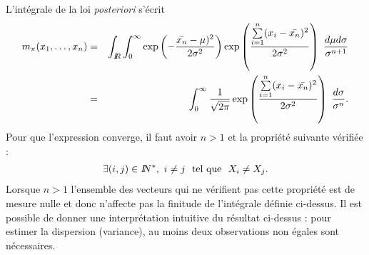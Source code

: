\begin{rep} %
L'intégrale de la loi {\it posteriori} s'écrit
\begin{eqnarray*}
m_{\pi}(x_1,\ldots,x_n) & = & \int_{\R} \int_{0}^{\infty} \exp\left(-\frac{\bar{x_n}-\mu)^2}{2\sigma^2}\right) \exp\left( \frac{\sum\limits_{i=1}^n (x_i-\bar{x_n})^2}{2\sigma^2}\right) \ \frac{d\mu d\sigma}{\sigma^{n+1}} \\
& = & \int_{0}^{\infty} \frac{1}{\sqrt{2\pi}} \exp\left(\frac{\sum\limits_{i=1}^n (x_i-\bar{x_n})^2}{2\sigma^2}\right) \ \frac{d\sigma}{\sigma^{n}}.
\end{eqnarray*}
Pour que l'expression converge, il faut avoir $n>1$ et la propriété suivante vérifiée :
\begin{eqnarray*}
\exists (i,j)\in I\!\!N^*, \ i\neq j \ \ \text{tel que} \ \ X_i\neq X_j. 
\end{eqnarray*}
Lorsque $n>1$ l'ensemble des vecteurs qui ne vérifient pas cette propriété est de mesure nulle et donc n'affecte pas la finitude de l'intégrale définie ci-dessus. Il est possible de donner une interprétation intuitive du résultat ci-dessus : pour estimer la dispersion (variance), au moins deux observations non égales sont nécessaires. 
\end{rep}
